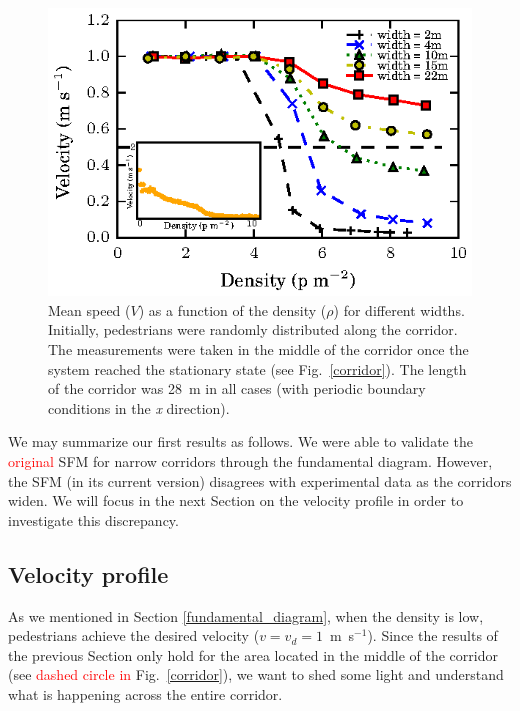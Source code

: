 \documentclass[preprint,12pt]{elsarticle}
\begin{document}
\begin{figure}[htbp!]
\centering
\includegraphics[width=0.7\columnwidth]
{./speed-density_vd1_multiple_widths.eps}
\caption{\label{fundamental_diagram_speed} Mean speed ($V$) as a function of the density ($\rho$) for different widths. Initially, 
pedestrians were randomly distributed along the corridor. The measurements were taken in the middle
of the corridor once the system reached the stationary state (see Fig.~\ref{corridor}). The length of the corridor 
was 28~m in all cases (with periodic boundary conditions in the \textit{x} direction).}
\end{figure}

We may summarize our first results as follows. We were able to validate the 
\textcolor{red}{original} SFM for narrow corridors through the fundamental 
diagram. However, the SFM (in its current version) disagrees with experimental 
data as the corridors widen. We will focus in the next Section on the velocity 
profile in order to investigate this discrepancy. 

\subsection{\label{velocity_profile} Velocity profile}

As we mentioned in Section \ref{fundamental_diagram}, when the density is low, pedestrians achieve the desired velocity ($v=v_d=1$~m~s$^{-1}$). Since the results of the previous Section only hold for the area located in the middle of the corridor (see \textcolor{red}{dashed circle in} Fig.~\ref{corridor}), we want to shed some light and understand what is happening across the entire corridor.\\
\end{document}
